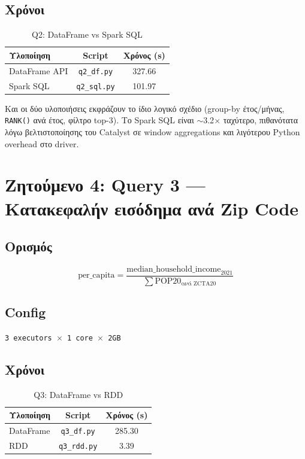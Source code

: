 \documentclass[11pt,a4paper]{article}
\begin{document}
\subsection{Χρόνοι}

\begin{table}[h]
\centering
\caption{Q2: DataFrame vs Spark SQL}
\begin{tabular}{lcc}
\toprule
Υλοποίηση & Script & Χρόνος (s) \\
\midrule
DataFrame API & \texttt{q2\_df.py} & 327.66 \\
Spark SQL & \texttt{q2\_sql.py} & 101.97 \\
\bottomrule
\end{tabular}
\end{table}

Και οι δύο υλοποιήσεις εκφράζουν το ίδιο λογικό σχέδιο (group-by έτος/μήνας,
\texttt{RANK()} ανά έτος, φίλτρο top-3). Το Spark SQL είναι $\sim$3.2$\times$
ταχύτερο, πιθανότατα λόγω βελτιστοποίησης του Catalyst σε window aggregations
και λιγότερου Python overhead στο driver.

\section{Ζητούμενο 4: Query 3 --- Κατακεφαλήν εισόδημα ανά Zip Code}

\subsection{Ορισμός}

\[
\text{per\_capita} = \frac{\text{median\_household\_income}_{2021}}{\sum \text{POP20}_{\text{ανά ZCTA20}}}
\]

\subsection{Config}
\texttt{3 executors $\times$ 1 core $\times$ 2GB}

\subsection{Χρόνοι}

\begin{table}[h]
\centering
\caption{Q3: DataFrame vs RDD}
\begin{tabular}{lcc}
\toprule
Υλοποίηση & Script & Χρόνος (s) \\
\midrule
DataFrame & \texttt{q3\_df.py} & 285.30 \\
RDD & \texttt{q3\_rdd.py} & 3.39 \\
\bottomrule
\end{tabular}
\end{table}
\end{document}
